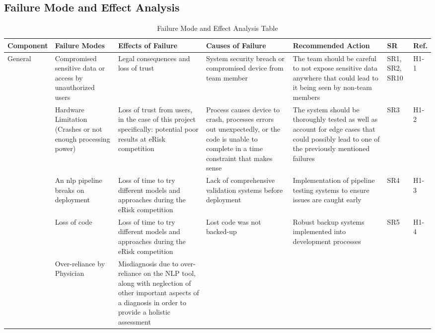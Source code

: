 \documentclass{article}
\begin{document}
\begin{landscape}
   \section{Failure Mode and Effect Analysis}
   \begin{longtable}{|p{}|p{}|p{}|p{}|p{}|p{}|p{}|}
       \caption{Failure Mode and Effect Analysis Table} \\
       \hline
       \textbf{Component} & \textbf{Failure Modes} & \textbf{Effects of Failure} & \textbf{Causes of Failure} & \textbf{Recommended Action} & \textbf{SR} & \textbf{Ref.} \\
       \hline
       \multirow{4}{*}{General}
       & Compromised sensitive data or access by unauthorized users
       & Legal consequences and loss of trust
       & System security breach or compromised device from team member
       & The team should be careful to not expose sensitive data anywhere that could lead to it being seen by non-team members
       & SR1, SR2, SR10
       & H1-1 \\
       \cline{2-7}
       & Hardware Limitation (Crashes or not enough processing power)
       & Loss of trust from users, in the case of this project specifically: potential poor results at eRisk competition
       & Process causes device to crash, processes errors out unexpectedly, or the code is unable to complete in a time constraint that makes sense
       & The system should be thoroughly tested as well as account for edge cases that could possibly lead to one of the previously mentioned failures
       & SR3
       & H1-2 \\
       \cline{2-7}
       & An nlp pipeline breaks on deployment
       & Loss of time to try different models and approaches during the eRisk competition
       & Lack of comprehensive validation systems before deployment
       & Implementation of pipeline testing systems to ensure issues are caught early
       & SR4
       & H1-3 \\
       \cline{2-7}
       \newpage \cline{2-7}
       & Loss of code
       & Loss of time to try different models and approaches during the eRisk competition
       & Lost code was not backed-up
       & Robust backup systems implemented into development processes
       & SR5
       & H1-4 \\
       \cline{2-7}
       & Over-reliance by Physician
       & Misdiagnosis due to over-reliance on the NLP tool, along with neglection of other important aspects of a diagnosis in order to provide a holistic assessment

\end{longtable}
\end{landscape}
\end{document}
